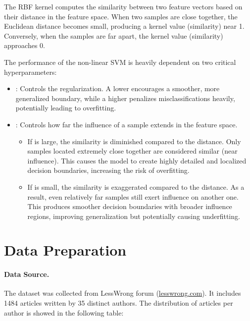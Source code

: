 \documentclass[11pt]{article}
\newcommand{\code}[1]{%
  \tcbox[on line, colback=codebg, colframe=codebg,
         boxrule=0pt, arc=2pt, left=2pt, right=2pt, top=0pt, bottom=0pt]
        {\ttfamily\small #1}}
\begin{document}
The RBF kernel computes the similarity between two feature vectors based on their distance in the feature space. When two samples are close together, the Euclidean distance becomes small, producing a kernel value (similarity) near 1. Conversely, when the samples are far apart, the kernel value (similarity) approaches 0.

The performance of the non-linear SVM is heavily dependent on two critical hyperparameters:
\begin{itemize}\setlength\itemsep{1pt}
  \item \textbf{\code{C}}: Controls the regularization. A lower \code{C} encourages a smoother, more generalized boundary, while a higher \code{C} penalizes misclassifications heavily, potentially leading to overfitting.
  \item \textbf{\code{$\gamma$}}: Controls how far the influence of a sample extends in the feature 
space.
  \begin{itemize}\setlength\itemsep{1pt}
      \item If \code{$\gamma$} is large, the similarity is diminished compared to the distance. Only samples located extremely close together are considered similar (near influence). This causes the model to create highly detailed and localized decision boundaries, increasing the risk of overfitting.
      \item If \code{$\gamma$} is small, the similarity is exaggerated compared to the distance. As a result, even relatively far samples still exert influence on another one. This produces smoother decision boundaries with broader influence regions, improving generalization but potentially causing underfitting.
  \end{itemize}
\end{itemize}

\section{Data Preparation}

\paragraph{Data Source.}
The dataset was collected from LessWrong forum (\url{lesswrong.com}). It includes 1484 articles written by 35 distinct authors. The distribution of articles per author is showed in the following table:
\end{document}
